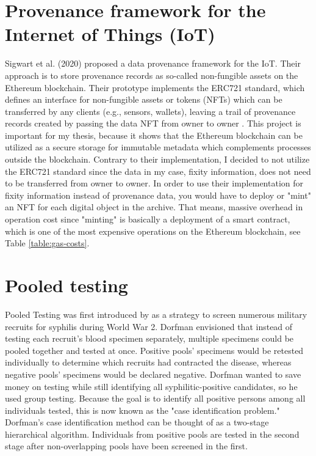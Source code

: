 \documentclass[final]{vutinfth}
\begin{document}
\section{Provenance framework for the Internet of Things (IoT)}
Sigwart et al. (2020) proposed a data provenance framework for the IoT. Their approach is to store provenance records as so-called non-fungible assets on the Ethereum blockchain. Their prototype implements the ERC721 standard, which defines an interface for non-fungible assets or tokens (NFTs) which can be transferred by any clients (e.g., sensors, wallets), leaving a trail of provenance records created by passing the data NFT from owner to owner \cite[7]{Sigwart2020}. 
This project is important for my thesis, because it shows that the Ethereum blockchain can be utilized as a secure storage for immutable metadata which complements processes outside the blockchain.
Contrary to their implementation, I decided to not utilize the ERC721 standard since the data in my case, fixity information, does not need to be transferred from owner to owner. In order to use their implementation for fixity information instead of provenance data, you would have to deploy or "mint" an NFT for each digital object in the archive. That means, massive overhead in operation cost since "minting" is basically a deployment of a smart contract, which is one of the most expensive operations on the Ethereum blockchain, see Table \ref{table:gas-costs}.

\section{Pooled testing}\label{sec:pooled}
Pooled Testing was first introduced by \cite{dorfman1943detection} as a strategy to screen numerous military recruits for syphilis during World War 2. Dorfman envisioned that instead of testing each recruit's blood specimen separately, multiple specimens could be pooled together and tested at once. Positive pools' specimens would be retested individually to determine which recruits had contracted the disease, whereas negative pools' specimens would be declared negative. Dorfman wanted to save money on testing while still identifying all syphilitic-positive candidates, so he used group testing. Because the goal is to identify all positive persons among all individuals tested, this is now known as the "case identification problem." Dorfman's case identification method can be thought of as a two-stage hierarchical algorithm. Individuals from positive pools are tested in the second stage after non-overlapping pools have been screened in the first.
\end{document}

